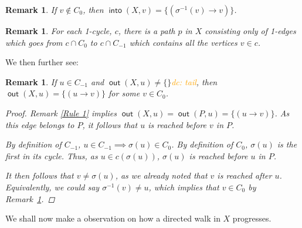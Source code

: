 \documentclass{article}
\newtheorem{rmk}[result]{Remark}
\theoremstyle{definition}
\DeclareMathOperator{\out}{\bm{\mathsf{out}}}
\DeclareMathOperator{\into}{\bm{\mathsf{into}}}
\newcommand{\dc}[1]{\textcolor{orange}{dc: #1}}
\begin{document}
\begin{rmk} \label{Rule 2.5} If $v \not \in C_0$, then $\into(X,v) = \{(\sigma^{-1}(v)\to v)\}$.
\end{rmk}

\begin{rmk}\label{Rule 2.75} For each 1-cycle, $c$, there is a path $p$ in $X$ consisting only of 1-edges which goes from $c\cap C_0$ to $c \cap C_{-1}$ which contains all the vertices $v \in c$.
\end{rmk}

\vspace{1.75em}
We then further see:
\begin{rmk} \label{Rule 3} If $u \in C_{-1}$ and $\out(X,u) \neq \{\}$\dc{ tail}, then $\out(X,u) = \{(u \to v)\}$ for some $v \in C_0$. 
\begin{proof}Remark \ref{Rule 1} implies $\out(X,u)= \out(P,u) = \{(u\to v)\}$. As this edge belongs to $P$, it follows that $u$ is reached before $v$ in $P$. 

\vspace{.75em}

By definition of $C_{-1}$, $u \in C_{-1} \implies \sigma(u) \in C_0$. By definition of $C_0$, $\sigma(u)$ is the first in its cycle. Thus, as $u \in c(\sigma(u))$, $\sigma(u)$ is reached before $u$ in $P$.

\vspace{.75em}

It then follows that $v\neq \sigma(u)$, as we already noted that $v$ is reached after $u$. Equivalently, we could say $\sigma^{-1}(v) \neq u$, which implies that $v \in C_0$ by Remark~\ref{Rule 2.5}.\end{proof}

\end{rmk}



\vspace{1.75em}

We shall now make a observation on how a directed walk in $X$ progresses. 
\end{document}

